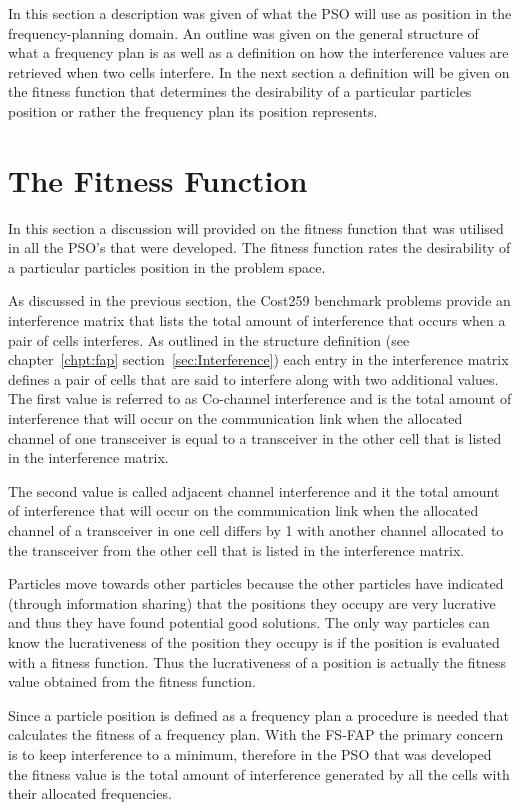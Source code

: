 In this section a description was given of what the PSO will use as position in the frequency-planning domain. An outline was given on the general structure of what a frequency plan is as well as a definition on how the interference values are retrieved when two cells interfere. In the next section a definition will be given on the fitness function that determines the desirability of a particular particles position or rather the frequency plan its position represents.
\section{The Fitness Function}
In this section a discussion will provided on the fitness function that was utilised in all the PSO's that were developed. The fitness function rates the desirability of a particular particles position in the problem space.

As discussed in the previous section, the Cost259 benchmark problems provide an interference matrix that lists the total amount of interference that occurs when a pair of cells interferes. As outlined in the structure definition (see chapter~\ref{chpt:fap} section~\ref{sec:Interference}) each entry in the interference matrix defines a pair of cells that are said to interfere along with two additional values. The first value is referred to as Co-channel interference and is the total amount of interference that will occur on the communication link when the allocated channel of one transceiver is equal to a transceiver in the other cell that is listed in the interference matrix. 

The second value is called adjacent channel interference and it the total amount of interference that will occur on the communication link when the allocated channel of a transceiver in one cell differs by 1 with another channel allocated to the transceiver from the other cell that is listed in the interference matrix.

Particles move towards other particles because the other particles have indicated (through information sharing) that the positions they occupy are very lucrative and thus they have found potential good solutions. The only way particles can know the lucrativeness of the position they occupy is if the position is evaluated with a fitness function. Thus the lucrativeness of a position is actually the fitness value obtained from the fitness function. 

Since a particle position is defined as a frequency plan a procedure is needed that calculates the fitness of a frequency plan. With the FS-FAP the primary concern is to keep interference to a minimum, therefore in the PSO that was developed the fitness value is the total amount of interference generated by all the cells with their allocated frequencies. 


